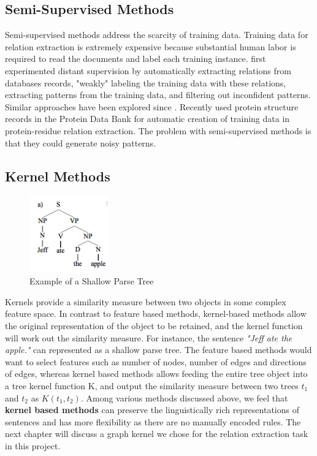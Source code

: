 \subsection{Semi-Supervised Methods}
Semi-supervised methods address the scarcity of training data. Training data for relation extraction is extremely expensive because substantial human labor is required to read the documents and label each training instance. \citet*{craven1999constructing} first experimented distant supervision by automatically extracting relations from databases records, "weakly" labeling the training data with these relations, extracting patterns from the training data, and filtering out inconfident patterns. Similar approaches have been explored since \cite{bunescu2007learning,min2013distant,mintz2009distant}. Recently \citet*{ravikumar2012literature} used protein structure records in the Protein Data Bank for automatic creation of training data in protein-residue relation extraction. The problem with semi-supervised methods is that they could generate noisy patterns\cite{nebhi2013rule}. 

\subsection{Kernel Methods}
\begin{figure}
	\centering
	\includegraphics[width=0.3\textwidth]{shallow_parse_tree}
	\caption{Example of a Shallow Parse Tree \cite{zelenko2003kernel}}
	\label{fig:shallow_parse_tree}   
\end{figure} 
Kernels provide a similarity measure between two objects in some complex feature space. In contrast to feature based methods, kernel-based methods allow the original representation of the object to be retained, and the kernel function will work out the similarity measure. For instance, the sentence \emph{"Jeff ate the apple."} can represented as a shallow parse tree\cite{zelenko2003kernel}. The feature based methods would want to select features such as number of nodes, number of edges and directions of edges, whereas kernel based methods allows feeding the entire tree object into a tree kernel function K\cite{collins2001convolution}, and output the similarity measure between two trees $t_{1}$ and $t_{2}$ as $K(t_{1}, t_{2})$. Among various methods discussed above, we feel that \textbf{kernel based methods} can preserve the linguistically rich representations of sentences and has more flexibility as there are no manually encoded rules. The next chapter will discuss a graph kernel we chose for the relation extraction task in this project.

